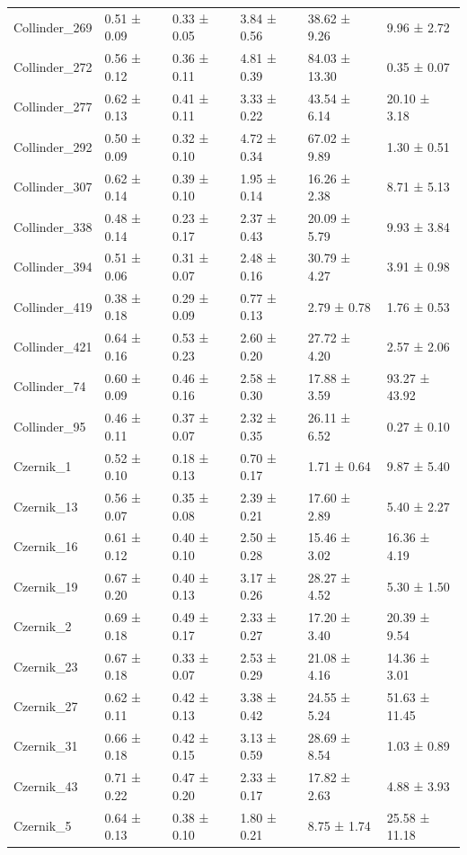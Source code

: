 \begin{tabular}{llllll}
Collinder_269 & 0.51 ± 0.09 & 0.33 ± 0.05 & 3.84 ± 0.56 & 38.62 ± 9.26 & 9.96 ± 2.72 \\
Collinder_272 & 0.56 ± 0.12 & 0.36 ± 0.11 & 4.81 ± 0.39 & 84.03 ± 13.30 & 0.35 ± 0.07 \\
Collinder_277 & 0.62 ± 0.13 & 0.41 ± 0.11 & 3.33 ± 0.22 & 43.54 ± 6.14 & 20.10 ± 3.18 \\
Collinder_292 & 0.50 ± 0.09 & 0.32 ± 0.10 & 4.72 ± 0.34 & 67.02 ± 9.89 & 1.30 ± 0.51 \\
Collinder_307 & 0.62 ± 0.14 & 0.39 ± 0.10 & 1.95 ± 0.14 & 16.26 ± 2.38 & 8.71 ± 5.13 \\
Collinder_338 & 0.48 ± 0.14 & 0.23 ± 0.17 & 2.37 ± 0.43 & 20.09 ± 5.79 & 9.93 ± 3.84 \\
Collinder_394 & 0.51 ± 0.06 & 0.31 ± 0.07 & 2.48 ± 0.16 & 30.79 ± 4.27 & 3.91 ± 0.98 \\
Collinder_419 & 0.38 ± 0.18 & 0.29 ± 0.09 & 0.77 ± 0.13 & 2.79 ± 0.78 & 1.76 ± 0.53 \\
Collinder_421 & 0.64 ± 0.16 & 0.53 ± 0.23 & 2.60 ± 0.20 & 27.72 ± 4.20 & 2.57 ± 2.06 \\
Collinder_74 & 0.60 ± 0.09 & 0.46 ± 0.16 & 2.58 ± 0.30 & 17.88 ± 3.59 & 93.27 ± 43.92 \\
Collinder_95 & 0.46 ± 0.11 & 0.37 ± 0.07 & 2.32 ± 0.35 & 26.11 ± 6.52 & 0.27 ± 0.10 \\
Czernik_1 & 0.52 ± 0.10 & 0.18 ± 0.13 & 0.70 ± 0.17 & 1.71 ± 0.64 & 9.87 ± 5.40 \\
Czernik_13 & 0.56 ± 0.07 & 0.35 ± 0.08 & 2.39 ± 0.21 & 17.60 ± 2.89 & 5.40 ± 2.27 \\
Czernik_16 & 0.61 ± 0.12 & 0.40 ± 0.10 & 2.50 ± 0.28 & 15.46 ± 3.02 & 16.36 ± 4.19 \\
Czernik_19 & 0.67 ± 0.20 & 0.40 ± 0.13 & 3.17 ± 0.26 & 28.27 ± 4.52 & 5.30 ± 1.50 \\
Czernik_2 & 0.69 ± 0.18 & 0.49 ± 0.17 & 2.33 ± 0.27 & 17.20 ± 3.40 & 20.39 ± 9.54 \\
Czernik_23 & 0.67 ± 0.18 & 0.33 ± 0.07 & 2.53 ± 0.29 & 21.08 ± 4.16 & 14.36 ± 3.01 \\
Czernik_27 & 0.62 ± 0.11 & 0.42 ± 0.13 & 3.38 ± 0.42 & 24.55 ± 5.24 & 51.63 ± 11.45 \\
Czernik_31 & 0.66 ± 0.18 & 0.42 ± 0.15 & 3.13 ± 0.59 & 28.69 ± 8.54 & 1.03 ± 0.89 \\
Czernik_43 & 0.71 ± 0.22 & 0.47 ± 0.20 & 2.33 ± 0.17 & 17.82 ± 2.63 & 4.88 ± 3.93 \\
Czernik_5 & 0.64 ± 0.13 & 0.38 ± 0.10 & 1.80 ± 0.21 & 8.75 ± 1.74 & 25.58 ± 11.18 \\

\end{tabular}
